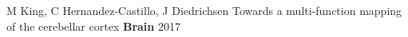 \begin{cventries}
  \cventry
    {M King, C Hernandez-Castillo, J Diedrichsen} %
    {Towards a multi-function mapping of the cerebellar cortex} %
    {\textbf{Brain}} %
    {2017} %
    {}
    
    
    
    

\end{cventries}


